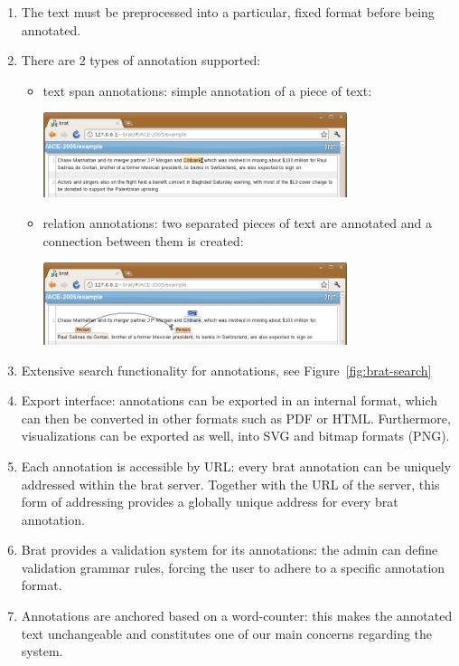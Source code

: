 \begin{enumerate}
\item The text must be preprocessed into a particular, fixed format before being
  annotated.
\item There are 2 types of annotation supported:
  \begin{itemize}
  \item text span annotations: simple annotation of a piece of text:
   \begin{center}
     \includegraphics[width=3.5in]{../PIC/brat-text-span}
   \end{center}
   
  \item relation annotations: two separated pieces of text are annotated and a connection between them is created:
    \begin{center}\includegraphics[width=3.5in]{../PIC/brat-relation}\end{center}
  \end{itemize}
\item Extensive search functionality for annotations, see Figure~\ref{fig:brat-search}
\item Export interface: annotations can be exported in an internal format, which can then
  be converted in other formats such as PDF or HTML. Furthermore, visualizations can be
  exported as well, into SVG and bitmap formats (PNG).
\item Each annotation is accessible by URL: every brat annotation can be uniquely
  addressed within the brat server. Together with the URL of the server, this form of
  addressing provides a globally unique address for every brat annotation.
\item Brat provides a validation system for its annotations: the admin can define
  validation grammar rules, forcing the user to adhere to a specific annotation format.
\item Annotations are anchored based on a word-counter: this makes the annotated text
  unchangeable and constitutes one of our main concerns regarding the system.
\end{enumerate}
